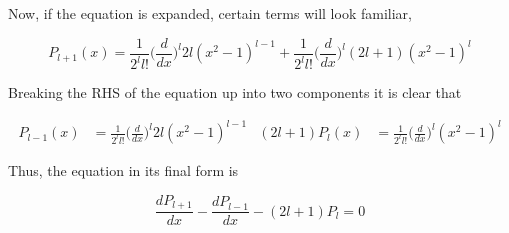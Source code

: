 \documentclass[11pt]{article}
\begin{document}
Now, if the equation is expanded, certain terms will look familiar,

$$
P_{l+1}(x) = \frac{1}{2^{l}l!}\Big(\frac{d}{dx}\Big)^{l} 2l(x^{2} - 1)^{l-1} + \frac{1}{2^{l}l!}\Big(\frac{d}{dx}\Big)^{l}(2l+1)(x^{2} - 1)^{l}
$$

Breaking the RHS of the equation up into two components it is clear that

\begin{align*}
    P_{l-1}(x) &= \frac{1}{2^{l}l!}\Big(\frac{d}{dx}\Big)^{l} 2l(x^{2} - 1)^{l-1} & (2l+1)P_{l}(x) &= \frac{1}{2^{l}l!}\Big(\frac{d}{dx}\Big)^{l}(x^{2} - 1)^{l}
\end{align*}

Thus, the equation in its final form is

$$
\frac{dP_{l+1}}{dx} - \frac{dP_{l-1}}{dx} - (2l+1)P_{l} = 0
$$

\clearpage

\end{document}
